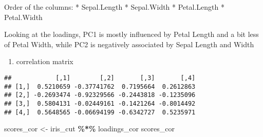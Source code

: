 \documentclass[
]{article}
\newenvironment{Shaded}{\begin{snugshade}}{\end{snugshade}}
\newcommand{\CommentTok}[1]{\textcolor[rgb]{0.56,0.35,0.01}{\textit{#1}}}
\newcommand{\FunctionTok}[1]{\textcolor[rgb]{0.13,0.29,0.53}{\textbf{#1}}}
\newcommand{\NormalTok}[1]{#1}
\newcommand{\OtherTok}[1]{\textcolor[rgb]{0.56,0.35,0.01}{#1}}
\newcommand{\SpecialCharTok}[1]{\textcolor[rgb]{0.81,0.36,0.00}{\textbf{#1}}}
\providecommand{\tightlist}{%
  \setlength{\itemsep}{0pt}\setlength{\parskip}{0pt}}
\begin{document}
Order of the columns: * Sepal.Length * Sepal.Width * Petal.Length *
Petal.Width

Looking at the loadings, PC1 is mostly influenced by Petal Length and a
bit less of Petal Width, while PC2 is negatively associated by Sepal
Length and Width

\begin{enumerate}
\def\labelenumi{\alph{enumi}.}
\setcounter{enumi}{1}
\tightlist
\item
  correlation matrix
\end{enumerate}

\begin{Shaded}
\end{Shaded}

\begin{verbatim}
##            [,1]        [,2]       [,3]       [,4]
## [1,]  0.5210659 -0.37741762  0.7195664  0.2612863
## [2,] -0.2693474 -0.92329566 -0.2443818 -0.1235096
## [3,]  0.5804131 -0.02449161 -0.1421264 -0.8014492
## [4,]  0.5648565 -0.06694199 -0.6342727  0.5235971
\end{verbatim}

\begin{Shaded}
\begin{Highlighting}[]
\NormalTok{scores\_cor }\OtherTok{\textless{}{-}}\NormalTok{ iris\_cut }\SpecialCharTok{\%*\%}\NormalTok{ loadings\_cor}
\NormalTok{scores\_cor}
\end{Highlighting}
\end{Shaded}
\end{document}
